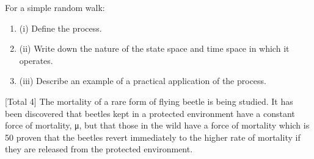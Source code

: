 \documentclass[a4paper,12pt]{article}
\begin{document}
For a simple random walk:

\begin{enumerate}
    \item (i) Define the process.
\item 
(ii) Write down the nature of the state space and time space in which it operates.
\item 
(iii) Describe an example of a practical application of the process.
\end{enumerate}
[Total 4]
The mortality of a rare form of flying beetle is being studied. It has been discovered
that beetles kept in a protected environment have a constant force of mortality, μ, but
that those in the wild have a force of mortality which is 50%
proven that the beetles revert immediately to the higher rate of mortality if they are
released from the protected environment.
\end{document}

